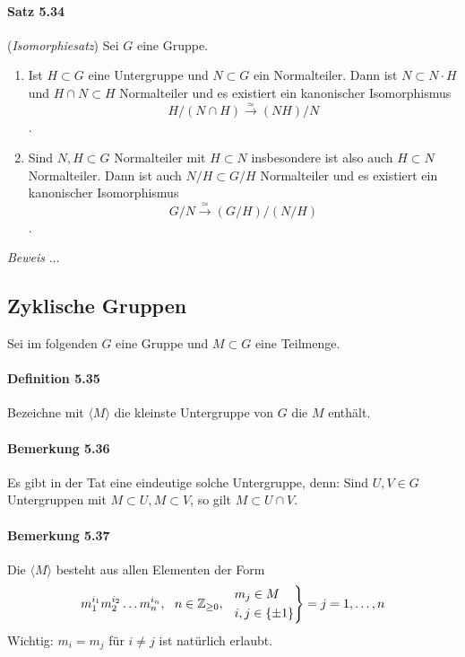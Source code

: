 \documentclass{scrartcl}
\begin{document}
\paragraph{Satz 5.34} (\textit{Isomorphiesatz}) Sei $G$ eine Gruppe.
\begin{enumerate}
\item Ist $H \subset G$ eine Untergruppe und $N \subset G$ ein Normalteiler.
  Dann ist $N \subset N \cdot H$ und $H \cap N \subset H$ Normalteiler und es
  existiert ein kanonischer Isomorphismus
  \[
    H/(N \cap H) \overset{\simeq}{\to} (NH)/N
  \]
  .
\item Sind $N, H \subset G$ Normalteiler mit $H \subset N$ insbesondere ist also
  auch $H \subset N$ Normalteiler. Dann ist auch $N/H \subset G/H$ Normalteiler
  und es existiert ein kanonischer Isomorphismus
  \[
    G/N \overset{\simeq}{\to}(G/H)/(N/H)
  \]
  .
\end{enumerate}
\textit{Beweis} $\dots$

\subsection{Zyklische Gruppen}
\label{subsec:zyklischegruppen}

Sei im folgenden $G$ eine Gruppe und $M \subset G$ eine Teilmenge.

\paragraph{Definition 5.35}
Bezeichne mit $\langle M \rangle$ die kleinste Untergruppe von $G$ die $M$
enthält.

\paragraph{Bemerkung 5.36}
Es gibt in der Tat eine eindeutige solche Untergruppe, denn: Sind $U,V \in G$
Untergruppen mit $M \subset U, M \subset V$,  so gilt $M \subset U \cap V$.

\paragraph{Bemerkung 5.37}
Die $\langle M \rangle$ besteht aus allen Elementen der Form
\[
  m_1^{i_1}m_2^{i_2} \dots m_n^{i_n} ,~~ n \in \mathbb{Z}_{\geq
    0},~~
  \begin{rcases}
    m_j \in M \\
    i,j \in \{\pm 1\}
  \end{rcases} = j = 1, \dots, n
\]
Wichtig: $m_i = m_j$ für $i \neq j$ ist natürlich erlaubt.
\end{document}
